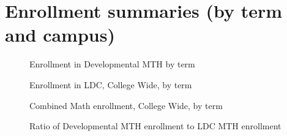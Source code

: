 \chapter{Enrollment summaries (by term and campus)}\label{sec:app:enrollment}

\begin{figure}[!htb]
  \begin{widepage}
  \hfill
    \begin{minipage}{.27\textwidth}
    	 \centering
          
          \caption{Enrollment in Developmental MTH by term}
    \end{minipage}%
  \hfill
    \begin{minipage}{.27\textwidth}
    	 \centering
          
          \caption{Enrollment in LDC, College Wide, by term}
    \end{minipage}
  \hfill

\vspace{2pc}

  \hfill
    \begin{minipage}{.27\textwidth}
    	 \centering
          
          \caption{Combined Math enrollment, College Wide, by term}
          \label{app:fig:totalenrollmentTerm}
    \end{minipage}%
  \hfill
    \begin{minipage}{.27\textwidth}
    	 \centering
         
          \caption{Ratio of Developmental MTH enrollment to LDC MTH enrollment}
          \label{app:fig:ratioDevelopToLDC}
    \end{minipage}
  \hfill    
  \end{widepage}
\end{figure}

